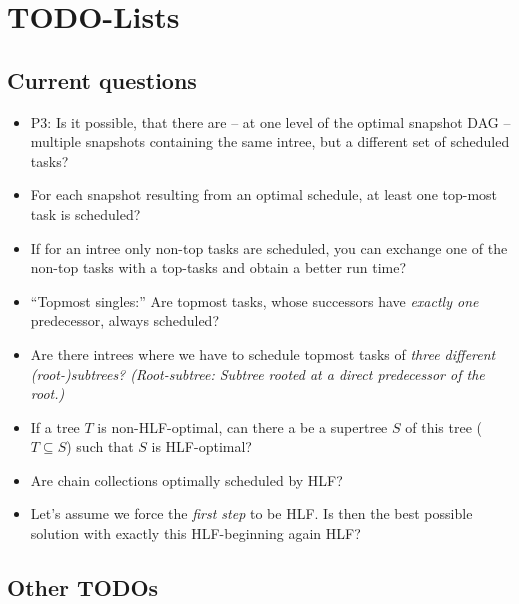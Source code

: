 \documentclass[a4paper, 11pt]{report}
\begin{document}
\chapter{TODO-Lists}
\label{chap:todo}

\section{Current questions}
\label{chap:current-questions}

\begin{itemize}
\item P3: Is it possible, that there are -- at one level of the optimal snapshot DAG -- multiple snapshots containing the same intree, but a different set of scheduled tasks? 
\item For each snapshot resulting from an optimal schedule, at least one top-most task is scheduled? 
\item If for an intree only non-top tasks are scheduled, you can exchange one of the non-top tasks with a top-tasks and obtain a better run time?
\item ``Topmost singles:'' Are topmost tasks, whose successors have \emph{exactly one} predecessor, always scheduled?
\item Are there intrees where we have to schedule topmost tasks of \emph{three different (root-)subtrees? (Root-subtree: Subtree rooted at a direct predecessor of the root.)}
\item If a tree $T$ is non-HLF-optimal, can there a be a supertree $S$ of this tree ($T\subseteq S$) such that $S$ is HLF-optimal? 
\item Are chain collections optimally scheduled by HLF?
\item Let's assume we force the \emph{first step} to be HLF. Is then the best possible solution with exactly this HLF-beginning again HLF?
\end{itemize}

\section{Other TODOs}
\end{document}
